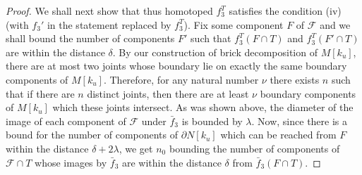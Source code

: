 \documentclass{amsart}
\theoremstyle{definition}
\numberwithin{figure}{section}
\numberwithin{equation}{section}
\newcommand{\length}{\mathrm{length}}
\def\length{\mathrm{length}}
\begin{document}
\begin{proof}
We shall next show that thus homotoped $f_3^T$ satisfies the condition (iv) (with $f_3'$ in the statement replaced by $f_3^T$).
Fix some component $F$ of $\mathcal F$ and we shall bound the number of components $F'$ such that $f_3^T(F \cap T)$ and $f_3^T(F'\cap T)$ are within the distance $\delta$.
By our construction of brick decomposition of $M[k_u]$, there are at most two joints whose boundary lie on exactly the same boundary components of $M[k_u]$.
Therefore, for any natural number $\nu$ there exists $n$ such that if there are $n$ distinct joints, then there are at least  $\nu$ boundary components of $M[k_u]$ which these joints intersect.
As was shown above, the diameter of the image of each component of $\mathcal F$ under $\bar f_3$ is bounded by $\lambda$. 
Now, since there is a bound for the number of components of $\partial N[k_u]$ which can be reached from $F$ within the distance $\delta + 2\lambda$, we get $n_0$ bounding the number of components of $\mathcal F \cap T$ whose images by $\bar f_3$ are within the distance $\delta$ from $\bar f_3(F \cap T)$.


\end{proof}
\end{document}
